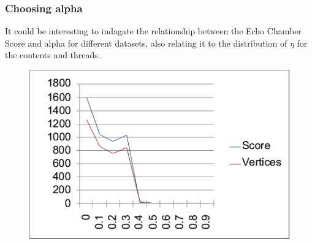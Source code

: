 \documentclass{beamer}
\begin{document}
\begin{frame}[c]
    \frametitle{Choosing alpha}
    It could be interesting to indagate the relationship between the Echo
    Chamber Score and alpha for different datasets, also relating it to the
    distribution of $\eta$ for the contents and threads.

    \begin{figure}[htpb]
        \centering
        \includegraphics[width=0.6\linewidth]{img/cats_alpha_choice.png}
        \label{fig:img/cats_alpha_choice}
    \end{figure}
\end{frame}
%
%
%
\end{document}
